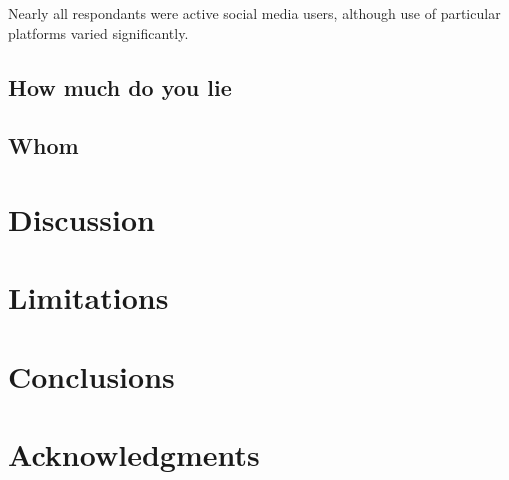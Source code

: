 \documentclass{sig-alternate}
\begin{document}
Nearly all respondants were active social media users, although use of particular platforms varied significantly. 

\subsection{How much do you lie}
\subsection{Whom }


\section{Discussion}

\section{Limitations}                 
                 
\section{Conclusions}

\section{Acknowledgments}
%

%
%
\end{document}
